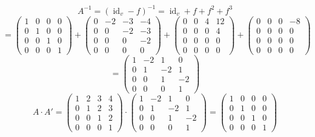 \documentclass[a4paper]{article}
\theoremstyle{definition}
\begin{document}
\[ A^{-1} = (\operatorname{id}_v - f)^{-1} = \operatorname{id}_v + f + f^2 + f^3 \]
\[
  = \begin{pmatrix}
    1 & 0 & 0 & 0 \\
    0 & 1 & 0 & 0 \\
    0 & 0 & 1 & 0 \\
    0 & 0 & 0 & 1
  \end{pmatrix}
  +
  \begin{pmatrix}
    0 & -2 & -3 & -4 \\
    0 & 0 & -2 & -3 \\
    0 & 0 & 0 & -2 \\
    0 & 0 & 0 & 0
  \end{pmatrix}
  +
  \begin{pmatrix} 0 & 0 & 4 & 12 \\ 0 & 0 & 0 & 4 \\ 0 & 0 & 0 & 0 \\ 0 & 0 & 0 & 0 \end{pmatrix}
  +
  \begin{pmatrix} 0 & 0 & 0 & -8 \\ 0 & 0 & 0 & 0 \\ 0 & 0 & 0 & 0 \\ 0 & 0 & 0 & 0 \end{pmatrix}
\] \[
  = \begin{pmatrix} 1 & -2 & 1 & 0 \\ 0 & 1 & -2 & 1 \\ 0 & 0 & 1 & -2 \\ 0 & 0 & 0 & 1 \end{pmatrix}
\] \[
  A \cdot A' =
  \begin{pmatrix} 1 & 2 & 3 & 4 \\ 0 & 1 & 2 & 3 \\ 0 & 0 & 1 & 2 \\ 0 & 0 & 0 & 1 \end{pmatrix} \cdot
  \begin{pmatrix} 1 & -2 & 1 & 0 \\ 0 & 1 & -2 & 1 \\ 0 & 0 & 1 & -2 \\ 0 & 0 & 0 & 1 \end{pmatrix}
  = \begin{pmatrix} 1 & 0 & 0 & 0 \\ 0 & 1 & 0 & 0 \\ 0 & 0 & 1 & 0 \\ 0 & 0 & 0 & 1 \end{pmatrix}
\]
\end{document}
